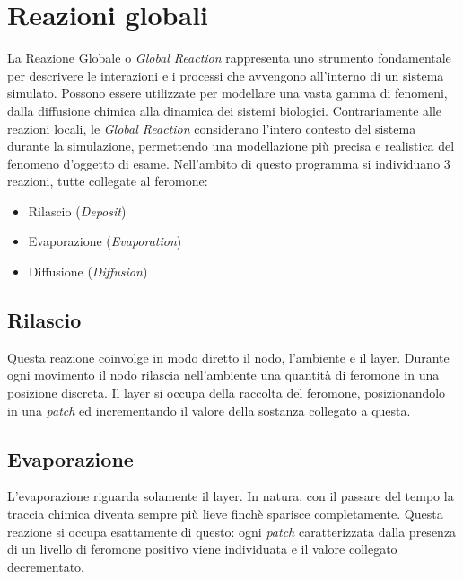 \documentclass[12pt,a4paper,openright,twoside]{book}
\begin{document}
\section{Reazioni globali}
La Reazione Globale o \textit{Global Reaction} rappresenta uno strumento fondamentale per descrivere
le interazioni e i processi che avvengono all'interno di un sistema simulato.
Possono essere utilizzate per modellare una vasta gamma di fenomeni, dalla diffusione chimica alla dinamica dei sistemi biologici.
Contrariamente alle reazioni locali, le \textit{Global Reaction} considerano l'intero contesto del sistema durante la 
simulazione, permettendo una modellazione più precisa e realistica del fenomeno d'oggetto di esame. 
Nell'ambito di questo programma si individuano 3 reazioni, tutte collegate al feromone:
\begin{itemize}
    \item Rilascio (\textit{Deposit})
    \item Evaporazione (\textit{Evaporation})
    \item Diffusione (\textit{Diffusion})
\end{itemize}
\subsection{Rilascio}
Questa reazione coinvolge in modo diretto il nodo, l'ambiente e il layer. Durante ogni movimento il nodo rilascia 
nell'ambiente una quantità di feromone in una posizione discreta. Il layer si occupa della raccolta del feromone,
posizionandolo in una \textit{patch} ed incrementando il valore della sostanza collegato a questa.
\subsection{Evaporazione}
L'evaporazione riguarda solamente il layer. In natura, con il passare del tempo la traccia chimica diventa sempre più
lieve finchè sparisce completamente. Questa reazione si occupa esattamente di questo: ogni \textit{patch} caratterizzata
dalla presenza di un livello di feromone positivo viene individuata e il valore collegato decrementato.
\end{document}
